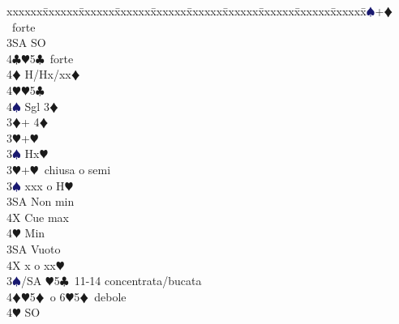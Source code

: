 \documentclass[a4paper,italian]{article}
\newcommand{\BC}{\textcolor{OliveGreen}{$\clubsuit$}}
\newcommand{\BD}{\textcolor{RedOrange}{$\vardiamondsuit$}}
\newcommand{\BH}{\textcolor{Red2}{$\varheartsuit${}}}
\newcommand{\BS}{\textcolor{MidnightBlue}{$\spadesuit${}}}
\newenvironment{bidtable}
{\begin{tabbing}

    xxxxxx\=xxxxxx\=xxxxxx\=xxxxxx\=xxxxxx\=xxxxxx\=xxxxxx\=xxxxxx\=xxxxxx\=xxxxxx\=\kill}
{\end{tabbing} }%
\begin{document}
\begin{multicols}{2}
\begin{bidtable}
                                            3\BS {}+\BD\ forte\+\\
                                            3SA \> SO\\
                                            4\BC {}\BH 5\BC\ forte\\
                                            4\BD \> H/Hx/xx\BD \\
                                            4\BH {}\BH 5\BC \\
                                            4\BS \> Sgl 3\BD \-\-\\
                                            3\BD {}+ 4\BD \+\\
                                            3\BH {}+\BH \\
                                            3\BS \> Hx\BH \-\\
                                            3\BH {}+\BH\ chiusa o semi\+\\
                                            3\BS \> xxx o H\BH \+\\
                                            3SA \> Non min\\
                                            4X \> Cue max\\
                                            4\BH \> Min\-\\
                                            3SA \> Vuoto\\
                                            4X \> x o xx\BH \-\\
                                            3\BS/SA \BH 5\BC\ 11-14 concentrata/bucata\\
                                            4\BD {}\BH5\BD\ o 6\BH5\BD\ debole\+\\
                                            4\BH \> SO
                                        \end{bidtable}
                                    \end{multicols}
                                    \newpage
\end{document}
